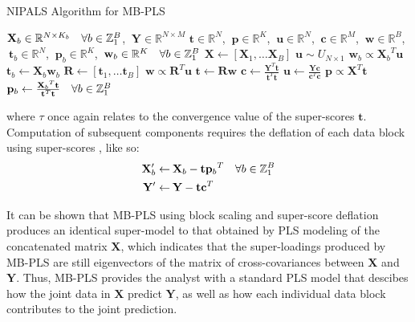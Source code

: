 \begin{algorithm}[H]
\caption{NIPALS Algorithm for MB-PLS}
\label{algorithm.3.5}
\begin{algorithmic}[1]
\REQUIRE $\mathbf{X}_b \in \mathbb{R}^{N \times K_b}
          \quad \forall b \in \mathbb{Z}_{1}^{B}$,%
       $\:\mathbf{Y} \in \mathbb{R}^{N \times M}$
\ENSURE $\mathbf{t} \in \mathbb{R}^N$,%
      $\:\mathbf{p} \in \mathbb{R}^K$,%
      $\:\mathbf{u} \in \mathbb{R}^N$,%
      $\:\mathbf{c} \in \mathbb{R}^M$,%
      $\:\mathbf{w} \in \mathbb{R}^B$,%
      $\:\mathbf{t}_b \in \mathbb{R}^N$,%
      $\:\mathbf{p}_b \in \mathbb{R}^K$,%
      $\:\mathbf{w}_b \in \mathbb{R}^K
       \quad \forall b \in \mathbb{Z}_{1}^{B}$
\STATE $\mathbf{X} \gets [\mathbf{X}_1, \dots \mathbf{X}_B]$
\STATE $\mathbf{u} \sim U_{N \times 1}$ 
\REPEAT
    \STATE $\mathbf{w}_b \propto {\mathbf{X}_b}^T \mathbf{u}$
    \STATE $\mathbf{t}_b \gets \mathbf{X}_b \mathbf{w}_b$
  \ENDFOR
  \STATE $\mathbf{R} \gets [\mathbf{t}_1, \dots \mathbf{t}_B]$
  \STATE $\mathbf{w} \propto \mathbf{R}^T \mathbf{u}$
  \STATE $\mathbf{t} \gets \mathbf{R} \mathbf{w}$
  \STATE $\mathbf{c} \gets \tfrac{\mathbf{Y}^T \mathbf{t}}
                                 {\mathbf{t}^T \mathbf{t}}$
  \STATE $\mathbf{u} \gets \tfrac{\mathbf{Y} \mathbf{c}}
                                 {\mathbf{c}^T \mathbf{c}}$
\UNTIL{$\tau < \varepsilon$}
\STATE $\mathbf{p} \propto \mathbf{X}^T \mathbf{t}$
\STATE $\mathbf{p}_b \gets \tfrac{{\mathbf{X}_b}^T \mathbf{t}}
                                 {\mathbf{t}^T \mathbf{t}}
        \quad \forall b \in \mathbb{Z}_{1}^{B}$
\end{algorithmic}
\end{algorithm}

\begin{doublespace}
where $\tau$ once again relates to the convergence value of the super-scores
$\mathbf{t}$. Computation of subsequent components requires the deflation of
each data block using super-scores \cite{westerhuis:jchemo1997}, like so:
\begin{align}
\mathbf{X}_b' \gets& \: \mathbf{X}_b - \mathbf{t} {\mathbf{p}_b}^T
 \quad \forall b \in \mathbb{Z}_{1}^{B} \\
\mathbf{Y}' \gets& \: \mathbf{Y} - \mathbf{t} \mathbf{c}^T
\end{align}

It can be shown \cite{westerhuis:jchemo1998} that MB-PLS using block scaling
and super-score deflation produces an identical super-model to that obtained
by PLS modeling of the concatenated matrix $\mathbf{X}$, which indicates that
the super-loadings produced by MB-PLS are still eigenvectors of the matrix of
cross-covariances between $\mathbf{X}$ and $\mathbf{Y}$. Thus, MB-PLS provides
the analyst with a standard PLS model that descibes how the joint data in
$\mathbf{X}$ predict $\mathbf{Y}$, as well as how each individual data block
contributes to the joint prediction.
\end{doublespace}


